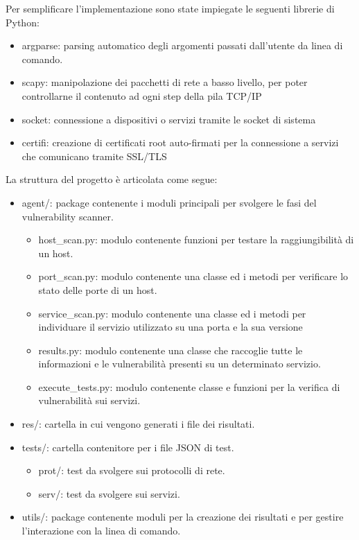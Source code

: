 \documentclass[12pt]{report}
\begin{document}
\noindent
Per semplificare l'implementazione sono state impiegate le seguenti librerie di Python: 
\begin{itemize}
    \item argparse: parsing automatico degli argomenti passati dall'utente da linea di comando.
    \item scapy: manipolazione dei pacchetti di rete a basso livello, per poter controllarne il contenuto ad ogni step della pila TCP/IP
    \item socket: connessione a dispositivi o servizi tramite le socket di sistema
    \item certifi: creazione di certificati root auto-firmati per la connessione a servizi che comunicano tramite SSL/TLS
\end{itemize}
La struttura del progetto è articolata come segue:
\begin{itemize}
    \item agent/: package contenente i moduli principali per svolgere le fasi del vulnerability scanner.
    \begin{itemize}
        \item host\_scan.py: modulo contenente funzioni per testare la raggiungibilità di un host.
        \item port\_scan.py: modulo contenente una classe ed i metodi per verificare lo stato delle porte di un host.
        \item service\_scan.py: modulo contenente una classe ed i metodi per individuare il servizio utilizzato su una porta e la sua versione
        \item results.py: modulo contenente una classe che raccoglie tutte le informazioni e le vulnerabilità presenti su un determinato servizio.
        \item execute\_tests.py: modulo contenente classe e funzioni per la verifica di vulnerabilità sui servizi.
    \end{itemize}
    \item res/: cartella in cui vengono generati i file dei risultati.
    \item tests/: cartella contenitore per i file JSON di test.
    \begin{itemize}
        \item prot/: test da svolgere sui protocolli di rete.
        \item serv/: test da svolgere sui servizi.
    \end{itemize}
    \item utils/: package contenente moduli per la creazione dei risultati e per gestire l'interazione con la linea di comando.

\end{itemize}
\end{document}
